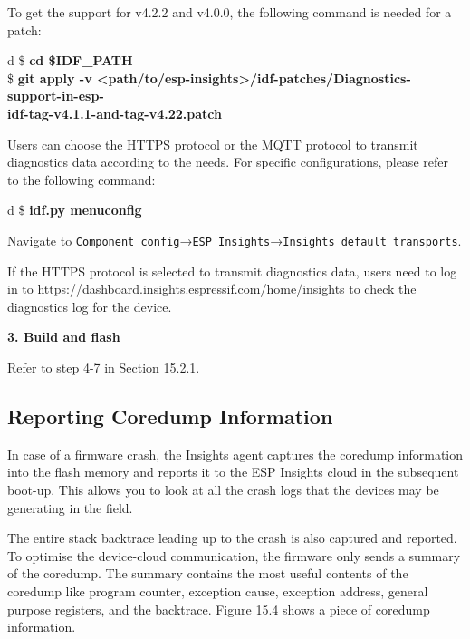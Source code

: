 \documentclass[a4paper,12pt]{book}
\begin{document}
To get the support for v4.2.2 and v4.0.0, the following command is needed for a patch:

\begin{codebloc}
\begin{tabular}{d}
\$ \textbf{cd \$IDF\_PATH}\\
\$ \textbf{git apply -v <path/to/esp-insights>/idf-patches/Diagnostics-support-in-esp-}\\
\textbf{idf-tag-v4.1.1-and-tag-v4.22.patch}
\end{tabular}
\end{codebloc}

Users can choose the HTTPS protocol or the MQTT protocol to transmit diagnostics data according to the needs. For specific configurations, please refer to the following command:

\begin{codebloc}
\begin{tabular}{d}
\$ \textbf{idf.py menuconfig}
\end{tabular}
\end{codebloc}

Navigate to \verb|Component config|→\verb|ESP Insights|→\verb|Insights default transports|.

If the HTTPS protocol is selected to transmit diagnostics data, users need to log in to \url{https://dashboard.insights.espressif.com/home/insights} to check the diagnostics log for the device.

\textbf{3. Build and flash}

Refer to step 4-7 in Section 15.2.1.

\subsection{Reporting Coredump Information}
In case of a firmware crash, the Insights agent captures the coredump information into the flash memory and reports it to the ESP Insights cloud in the subsequent boot-up. This allows you to look at all the crash logs that the devices may be generating in the field.

The entire stack backtrace leading up to the crash is also captured and reported. To optimise the device-cloud communication, the firmware only sends a summary of the coredump. The summary contains the most useful contents of the coredump like program counter, exception cause, exception address, general purpose registers, and the backtrace. Figure 15.4 shows a piece of coredump information.
\end{document}
